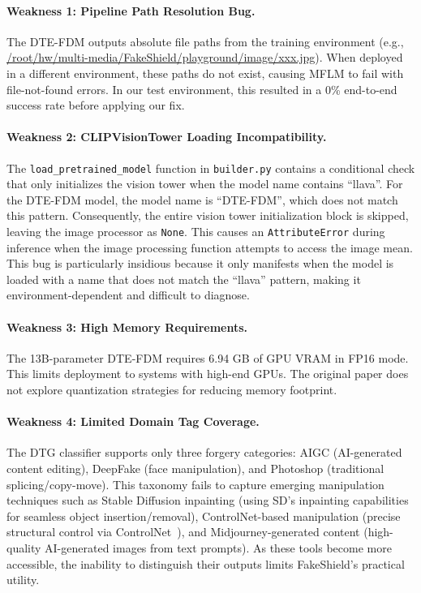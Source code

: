 \paragraph{Weakness 1: Pipeline Path Resolution Bug.} The DTE-FDM outputs absolute file paths from the training environment (e.g., \url{/root/hw/multi-media/FakeShield/playground/image/xxx.jpg}). When deployed in a different environment, these paths do not exist, causing MFLM to fail with file-not-found errors. In our test environment, this resulted in a 0\% end-to-end success rate before applying our fix.

\paragraph{Weakness 2: CLIPVisionTower Loading Incompatibility.} The \texttt{load\_pretrained\_model} function in \texttt{builder.py} contains a conditional check that only initializes the vision tower when the model name contains ``llava''. For the DTE-FDM model, the model name is ``DTE-FDM'', which does not match this pattern. Consequently, the entire vision tower initialization block is skipped, leaving the image processor as \texttt{None}. This causes an \texttt{AttributeError} during inference when the image processing function attempts to access the image mean. This bug is particularly insidious because it only manifests when the model is loaded with a name that does not match the ``llava'' pattern, making it environment-dependent and difficult to diagnose.

\paragraph{Weakness 3: High Memory Requirements.} The 13B-parameter DTE-FDM requires 6.94 GB of GPU VRAM in FP16 mode. This limits deployment to systems with high-end GPUs. The original paper does not explore quantization strategies for reducing memory footprint.

\paragraph{Weakness 4: Limited Domain Tag Coverage.} The DTG classifier supports only three forgery categories: AIGC (AI-generated content editing), DeepFake (face manipulation), and Photoshop (traditional splicing/copy-move). This taxonomy fails to capture emerging manipulation techniques such as Stable Diffusion inpainting (using SD's inpainting capabilities for seamless object insertion/removal), ControlNet-based manipulation (precise structural control via ControlNet~\citep{controlnet}), and Midjourney-generated content (high-quality AI-generated images from text prompts). As these tools become more accessible, the inability to distinguish their outputs limits FakeShield's practical utility.

